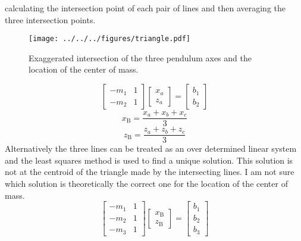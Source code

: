 \documentclass{bmd2010p}
\begin{document}
calculating the intersection point of each pair of lines and then averaging the
three intersection points.
\begin{figure}[htpb]
    \begin{center}
        \texttt{[image: ../../../figures/triangle.pdf]}
    \end{center}
    \caption{Exaggerated intersection of the three pendulum axes and the
    location of the center of mass.}
    \label{fig:triangle}
\end{figure}
\begin{equation}
	\left[
	\begin{array}{cc}
		-m_1 & 1\\
		-m_2 & 1
	\end{array}
	\right]
	\left[
	\begin{array}{c}
		x_a\\
		z_a
	\end{array}
	\right]
	=
	\left[
	\begin{array}{c}
		b_1\\
		b_2
	\end{array}
	\right]
\label{eq:linearSystem}
\end{equation}
\begin{equation}
    x_\mathrm{B} = \frac{x_a + x_b + x_c}{3}
\end{equation}
\begin{equation}
    z_\mathrm{B} = \frac{z_a + z_b + z_c}{3}
\end{equation}
Alternatively the three lines can be treated as an over determined linear
system and the least squares method is used to find a unique solution. This
solution is not at the centroid of the triangle made by the intersecting lines.
I am not sure which solution is theoretically the correct one for the location
of the center of mass.
\begin{equation}
	\left[
	\begin{array}{cc}
		-m_1 & 1\\
		-m_2 & 1\\
		-m_3 & 1
	\end{array}
	\right]
	\left[
	\begin{array}{c}
        x_\mathrm{B}\\
        z_\mathrm{B}
	\end{array}
	\right]
	=
	\left[
	\begin{array}{c}
		b_1\\
		b_2\\
		b_3
	\end{array}
	\right]	
\label{eq:leastSquares}
\end{equation}
\end{document}
